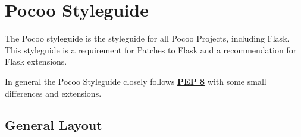 \documentclass[a4paper,12pt]{sphinxmanual}
\begin{document}
\chapter{Pocoo Styleguide}
\label{styleguide:pocoo-styleguide}\label{styleguide:irc-channel}\label{styleguide::doc}
The Pocoo styleguide is the styleguide for all Pocoo Projects, including
Flask.  This styleguide is a requirement for Patches to Flask and a
recommendation for Flask extensions.

In general the Pocoo Styleguide closely follows \href{http://www.python.org/dev/peps/pep-0008}{\textbf{PEP 8}} with some small
differences and extensions.


\section{General Layout}
\end{document}
